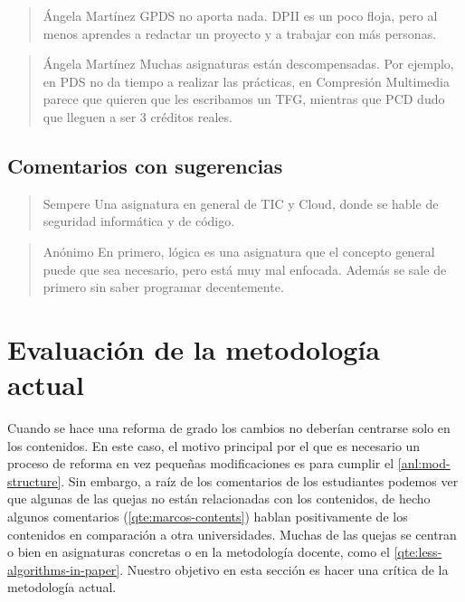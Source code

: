 \begin{quote}{Ángela Martínez}
    GPDS no aporta nada. DPII es un poco floja, pero al menos
    aprendes a redactar un proyecto y a trabajar con más personas.
\end{quote}

\begin{quote}{Ángela Martínez}
    Muchas asignaturas están descompensadas.
    Por ejemplo, en PDS no da tiempo a realizar las prácticas,
    en Compresión Multimedia parece que quieren que les escribamos un TFG,
    mientras que PCD dudo que lleguen a ser 3 créditos reales.
\end{quote}

\subsection{Comentarios con sugerencias}

\begin{quote}{Sempere}
    Una asignatura en general de TIC y Cloud,
    donde se hable de seguridad informática y de código.
\end{quote}

\begin{quote}{Anónimo}
    En primero, lógica es una asignatura que el concepto general puede que
    sea necesario, pero está muy mal enfocada. Además se sale de primero
    sin saber programar decentemente.
\end{quote}

\section{Evaluación de la metodología actual}


Cuando se hace una reforma de grado
los cambios no deberían centrarse solo en los contenidos.
En este caso, el motivo principal por el que es necesario un proceso de reforma
en vez pequeñas modificaciones es para cumplir el \cref{anl:mod-structure}.
Sin embargo, a raíz de los comentarios de los estudiantes podemos ver
que algunas de las quejas no están relacionadas con los contenidos,
de hecho algunos comentarios (\cref{qte:marcos-contents})
hablan positivamente de los contenidos en comparación a otra universidades.
Muchas de las quejas se centran o bien en asignaturas concretas
o en la metodología docente, como el \cref{qte:less-algorithms-in-paper}.
Nuestro objetivo en esta sección es hacer una crítica de la metodología actual.

